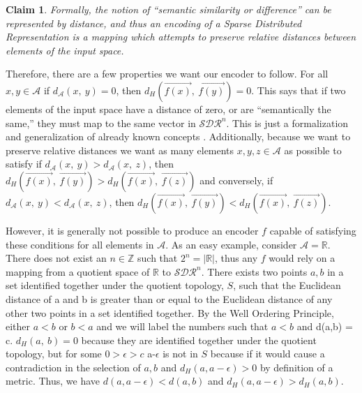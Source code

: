 \documentclass[fleqn,notitlepage,minimal]{article}
\newtheorem{clm}{Claim}
\begin{document}
	\begin{clm}
		Formally, the notion of ``semantic similarity or difference'' can be represented by distance, and thus an encoding of a Sparse Distributed Representation is a mapping which attempts to preserve relative distances between elements of the input space.
	\end{clm}
	
	Therefore, there are a few properties we want our encoder to follow. For all $x,y \in \mathcal{A}$ if  $d_{\mathcal{A}}(x, \ y) = 0$, then $d_{H}(\overrightarrow{f(x)}, \ \overrightarrow{f(y)}) = 0$. This says that if two elements of the input space have a distance of zero, or are ``semantically the same,'' they must map to the same vector in $\mathcal{SDR}^{n}$. This is just a formalization and generalization of already known concepts \cite{Purdy}. Additionally, because we want to preserve relative distances we want as many elements $x,y,z \in \mathcal{A}$ as possible to satisfy if $d_{\mathcal{A}}(x, \ y) > d_{\mathcal{A}}(x, \ z)$, then $d_{H}(\overrightarrow{f(x)}, \ \overrightarrow{f(y)}) > d_{H}(\overrightarrow{f(x)}, \ \overrightarrow{f(z)})$ and conversely, if $d_{\mathcal{A}}(x, \ y) < d_{\mathcal{A}}(x, \ z)$, then $d_{H}(\overrightarrow{f(x)}, \ \overrightarrow{f(y)}) < d_{H}(\overrightarrow{f(x)}, \ \overrightarrow{f(z)})$. 
	
	However, it is generally not possible to produce an encoder $f$ capable of satisfying these conditions for all elements in $\mathcal{A}$. As an easy example, consider $\mathcal{A} = \mathbb{R}$. There does not exist an $n \in \mathbb{Z}$ such that $2^{n} = |\mathbb{R}|$, thus any $f$ would rely on a mapping from a quotient space of $\mathbb{R}$ to $\mathcal{SDR}^{n}$. There exists two points $a,b$ in a set identified together under the quotient topology, $S$, such that the Euclidean distance of a and b is greater than or equal to the Euclidean distance of any other two points in a set identified together. By the Well Ordering Principle, either $a < b$ or $b < a$ and we will label the numbers such that $a < b$ and d(a,b) = c. $d_{H}(a, \ b) = 0$ because they are identified together under the quotient topology, but for some $0 > \epsilon > c$ a-$\epsilon$ is not in $S$ because if it would cause a contradiction in the selection of $a,b$ and $d_{H}(a, a-\epsilon) > 0$ by definition of a metric. Thus, we have $d(a,a-\epsilon) < d(a, b)$ and $d_{H}(a, a-\epsilon) > d_{H}(a,b)$. 
	
\end{document}
